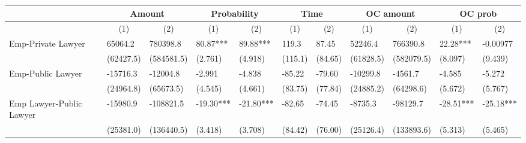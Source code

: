 \begin{tabular}{rrrrrrrrrrr}
\toprule
      & \multicolumn{2}{c}{Amount} & \multicolumn{2}{c}{Probability} & \multicolumn{2}{c}{Time} & \multicolumn{2}{c}{OC amount} & \multicolumn{2}{c}{OC prob} \\
\midrule
      & \multicolumn{1}{c}{(1)} & \multicolumn{1}{c}{(2)} & \multicolumn{1}{c}{(1)} & \multicolumn{1}{c}{(2)} & \multicolumn{1}{c}{(1)} & \multicolumn{1}{c}{(2)} & \multicolumn{1}{c}{(1)} & \multicolumn{1}{c}{(2)} & \multicolumn{1}{c}{(1)} & \multicolumn{1}{c}{(2)} \\
      \midrule
\multicolumn{1}{l}{Emp-Private Lawyer} & \multicolumn{1}{l}{65064.2} & \multicolumn{1}{l}{780398.8} & \multicolumn{1}{l}{80.87***} & \multicolumn{1}{l}{89.88***} & \multicolumn{1}{l}{119.3} & \multicolumn{1}{l}{87.45} & \multicolumn{1}{l}{52246.4} & \multicolumn{1}{l}{766390.8} & \multicolumn{1}{l}{22.28***} & \multicolumn{1}{l}{-0.00977} \\
\multicolumn{1}{l}{} & \multicolumn{1}{l}{(62427.5)} & \multicolumn{1}{l}{(584581.5)} & \multicolumn{1}{l}{(2.761)} & \multicolumn{1}{l}{(4.918)} & \multicolumn{1}{l}{(115.1)} & \multicolumn{1}{l}{(84.65)} & \multicolumn{1}{l}{(61828.5)} & \multicolumn{1}{l}{(582079.5)} & \multicolumn{1}{l}{(8.097)} & \multicolumn{1}{l}{(9.439)} \\
\multicolumn{1}{l}{Emp-Public Lawyer} & \multicolumn{1}{l}{-15716.3} & \multicolumn{1}{l}{-12004.8} & \multicolumn{1}{l}{-2.991} & \multicolumn{1}{l}{-4.838} & \multicolumn{1}{l}{-85.22} & \multicolumn{1}{l}{-79.60} & \multicolumn{1}{l}{-10299.8} & \multicolumn{1}{l}{-4561.7} & \multicolumn{1}{l}{-4.585} & \multicolumn{1}{l}{-5.272} \\
\multicolumn{1}{l}{} & \multicolumn{1}{l}{(24964.8)} & \multicolumn{1}{l}{(65673.5)} & \multicolumn{1}{l}{(4.545)} & \multicolumn{1}{l}{(4.661)} & \multicolumn{1}{l}{(83.75)} & \multicolumn{1}{l}{(77.84)} & \multicolumn{1}{l}{(24885.2)} & \multicolumn{1}{l}{(64298.6)} & \multicolumn{1}{l}{(5.672)} & \multicolumn{1}{l}{(5.767)} \\
\multicolumn{1}{l}{Emp Lawyer-Public Lawyer} & \multicolumn{1}{l}{-15980.9} & \multicolumn{1}{l}{-108821.5} & \multicolumn{1}{l}{-19.30***} & \multicolumn{1}{l}{-21.80***} & \multicolumn{1}{l}{-82.65} & \multicolumn{1}{l}{-74.45} & \multicolumn{1}{l}{-8735.3} & \multicolumn{1}{l}{-98129.7} & \multicolumn{1}{l}{-28.51***} & \multicolumn{1}{l}{-25.18***} \\
\multicolumn{1}{l}{} & \multicolumn{1}{l}{(25381.0)} & \multicolumn{1}{l}{(136440.5)} & \multicolumn{1}{l}{(3.418)} & \multicolumn{1}{l}{(3.708)} & \multicolumn{1}{l}{(84.42)} & \multicolumn{1}{l}{(76.00)} & \multicolumn{1}{l}{(25126.4)} & \multicolumn{1}{l}{(133893.6)} & \multicolumn{1}{l}{(5.313)} & \multicolumn{1}{l}{(5.465)} \\

\end{tabular}
